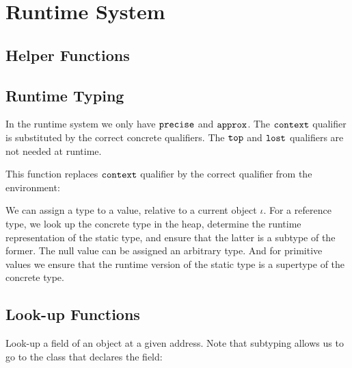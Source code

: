 \section{Runtime System}
\label{enerj:rt}

\subsection{Helper Functions}

\vspace{0.5ex}
\ottdefncreation{}
\vspace{2.0ex}

\vspace{0.5ex}
\ottdefnupdate{}
\vspace{2.0ex}


\subsection{Runtime Typing}

In the runtime system we only have $ \texttt{\upshape{precise}\,\!} $ and $ \texttt{\upshape{approx}\,\!} $.
The $ \texttt{\upshape{context}\,\!} $ qualifier is substituted by the correct concrete
qualifiers.
The $ \texttt{\upshape{top}\,\!} $ and $ \texttt{\upshape{lost}\,\!} $ qualifiers are not needed at runtime.

This function replaces $ \texttt{\upshape{context}\,\!} $ qualifier by the correct
qualifier from the environment:

\vspace{0.5ex}
\ottdefnsTXXrT{}
\vspace{2.0ex}


We can assign a type to a value, relative to a current object
$\iota$.
For a reference type, we look up the concrete type in the heap,
determine the runtime representation of the static type, and ensure
that the latter is a subtype of the former.
The null value can be assigned an arbitrary type.
And for primitive values we ensure that the runtime version of the
static type is a supertype of the concrete type.

\vspace{0.5ex}
\ottdefnrttyping{}
\vspace{2.0ex}


\subsection{Look-up Functions}

Look-up a field of an object at a given address.
Note that subtyping allows us to go to the class that declares the
field:

